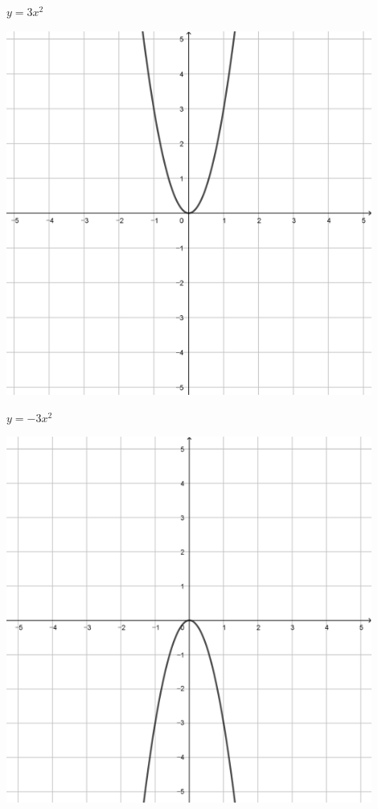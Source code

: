 \documentclass[a4paper]{oblivoir}
\begin{document}
\clearpage
\begin{minipage}{0.45\textwidth}\centering
\(y=3x^2\)
\par\bigskip\includegraphics[width=0.9\textwidth]{img/2_quadratic_5}
\end{minipage}
\begin{minipage}{0.45\textwidth}\centering
\(y=-3x^2\)
\par\bigskip\includegraphics[width=0.9\textwidth]{img/2_quadratic_6}
\end{minipage}\bigskip\bigskip\par
\end{document}

